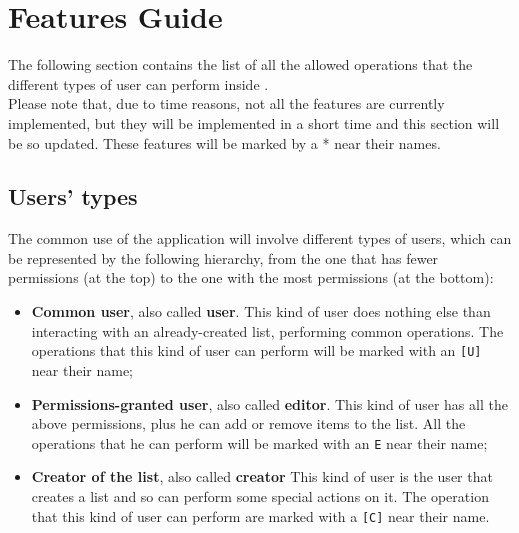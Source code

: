 \section{Features Guide}
The following section contains the list of all the allowed operations that the different types of user can perform inside \app. \\
Please note that, due to time reasons, not all the features are currently implemented, but they will be implemented in a short time and this section will be so updated. These features will be marked by a * near their names.

\subsection{Users' types}
The common use of the application will involve different types of users, which can be represented by the following hierarchy, from the one that has fewer permissions (at the top) to the one with the most permissions (at the bottom):
\begin{itemize}
	\item \textbf{Common user}, also called \textbf{user}.
		  This kind of user does nothing else than interacting with an already-created list, performing common operations. The operations that this kind of user can perform will be marked with an \texttt{[U]} near their name;
	\item \textbf{Permissions-granted user}, also called \textbf{editor}.
		  This kind of user has all the above permissions, plus he can add or remove items to the list. All the operations that he can perform will be marked with an \texttt{E} near their name;
	\item \textbf{Creator of the list}, also called \textbf{creator}
		  This kind of user is the user that creates a list and so can perform some special actions on it. The operation that this kind of user can perform are marked with a \texttt{[C]} near their name.
\end{itemize}



%






%